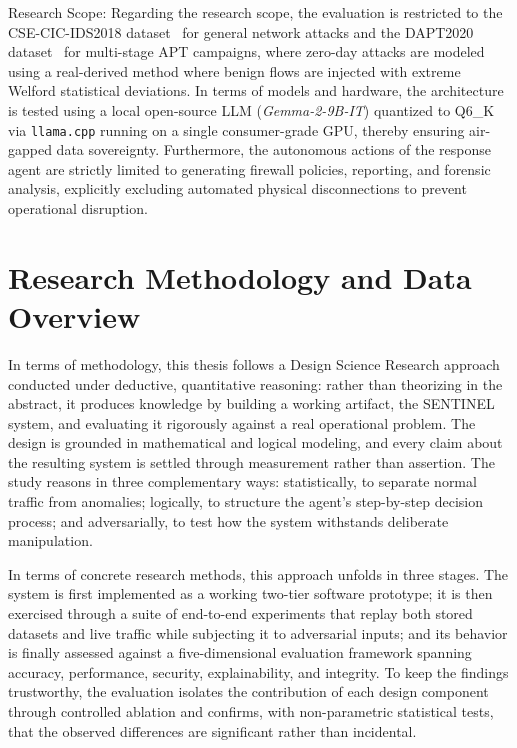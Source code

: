 Research Scope: Regarding the research scope, the evaluation is restricted to the CSE-CIC-IDS2018 dataset~\cite{ids2018} for general network attacks and the DAPT2020 dataset~\cite{dapt2020} for multi-stage APT campaigns, where zero-day attacks are modeled using a real-derived method where benign flows are injected with extreme Welford statistical deviations. In terms of models and hardware, the architecture is tested using a local open-source LLM (\textit{Gemma-2-9B-IT}) quantized to Q6\_K via \texttt{llama.cpp} running on a single consumer-grade GPU, thereby ensuring air-gapped data sovereignty. Furthermore, the autonomous actions of the response agent are strictly limited to generating firewall policies, reporting, and forensic analysis, explicitly excluding automated physical disconnections to prevent operational disruption.

\section{Research Methodology and Data Overview}

In terms of methodology, this thesis follows a Design Science Research approach conducted under deductive, quantitative reasoning: rather than theorizing in the abstract, it produces knowledge by building a working artifact, the SENTINEL system, and evaluating it rigorously against a real operational problem. The design is grounded in mathematical and logical modeling, and every claim about the resulting system is settled through measurement rather than assertion. The study reasons in three complementary ways: statistically, to separate normal traffic from anomalies; logically, to structure the agent's step-by-step decision process; and adversarially, to test how the system withstands deliberate manipulation.

In terms of concrete research methods, this approach unfolds in three stages. The system is first implemented as a working two-tier software prototype; it is then exercised through a suite of end-to-end experiments that replay both stored datasets and live traffic while subjecting it to adversarial inputs; and its behavior is finally assessed against a five-dimensional evaluation framework spanning accuracy, performance, security, explainability, and integrity. To keep the findings trustworthy, the evaluation isolates the contribution of each design component through controlled ablation and confirms, with non-parametric statistical tests, that the observed differences are significant rather than incidental.

